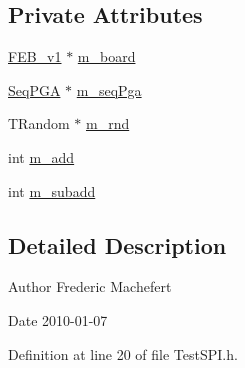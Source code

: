 \subsection*{Private Attributes}
\begin{DoxyCompactItemize}
\item 
\hyperlink{classFEB__v1}{FEB\_\-v1} $\ast$ \hyperlink{classTestSPI_a2852d24b4449df4c3722c25c7d9e08d4}{m\_\-board}
\item 
\hyperlink{classSeqPGA}{SeqPGA} $\ast$ \hyperlink{classTestSPI_aab9cccf2a1594a2539b11d6c637389b0}{m\_\-seqPga}
\item 
TRandom $\ast$ \hyperlink{classTestSPI_a6dd3f4705c0fc8f36a3e71e67517e1cc}{m\_\-rnd}
\item 
int \hyperlink{classTestSPI_aa30affe50de58083b1dcca878903b0a7}{m\_\-add}
\item 
int \hyperlink{classTestSPI_a4bc59347208b4a5ae97188bdcfc31da2}{m\_\-subadd}
\end{DoxyCompactItemize}


\subsection{Detailed Description}
\begin{DoxyAuthor}{Author}
Frederic Machefert 
\end{DoxyAuthor}
\begin{DoxyDate}{Date}
2010-\/01-\/07 
\end{DoxyDate}


Definition at line 20 of file TestSPI.h.


